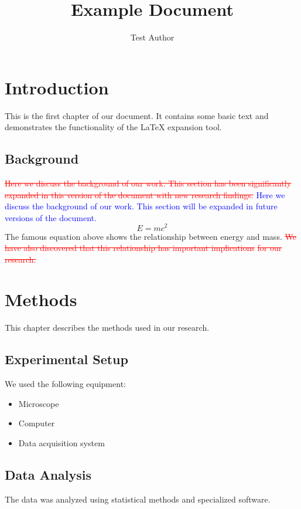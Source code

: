 \documentclass{article}
\title{Example Document}
\author{Test Author}
\newcommand{\DIFdel}[1]{\textcolor{red}{\sout{#1}}}
\newcommand{\DIFadd}[1]{\textcolor{blue}{#1}}
\begin{document}
\maketitle
\section{Introduction}
This is the first chapter of our document. It contains some basic text
and demonstrates the functionality of the LaTeX expansion tool.
\subsection{Background}
\DIFdel{Here we discuss the background of our work. This section has been significantly
}\DIFdel{expanded in this version of the document with new research findings.
}\DIFadd{Here we discuss the background of our work. This section will be expanded
}\DIFadd{in future versions of the document.
}\begin{equation}
E = mc^2
\end{equation}
The famous equation above shows the relationship between energy and mass.
\DIFdel{We have also discovered that this relationship has important implications
}\DIFdel{for our research.
}\section{Methods}
This chapter describes the methods used in our research.
\subsection{Experimental Setup}
We used the following equipment:
\begin{itemize}
\item Microscope
\item Computer
\item Data acquisition system
\end{itemize}
\subsection{Data Analysis}
The data was analyzed using statistical methods and specialized software.
\end{document}

